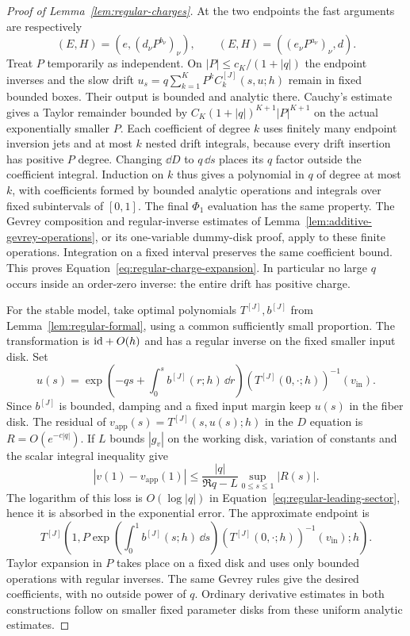 \begin{proof}[Proof of Lemma~\ref{lem:regular-charges}]
At the two endpoints the fast arguments are respectively
\[
 (E,H)=(e,(d_\nu P^{b_\nu})_\nu),\qquad
 (E,H)=((e_\nu P^{a_\nu})_\nu,d).
\]
Treat $P$ temporarily as independent.  On
$|P|\le c_K/(1+|q|)$ the endpoint inverses and the slow drift
$u_s=q\sum_{k=1}^KP^kC_k^{[J]}(s,u;h)$ remain in fixed bounded
boxes.  Their output is bounded and analytic there.  Cauchy's
estimate gives a Taylor remainder bounded by
$C_K(1+|q|)^{K+1}|P|^{K+1}$ on the actual exponentially smaller
$P$.  Each coefficient of degree $k$ uses finitely many endpoint
inversion jets and at most $k$ nested drift integrals, because every
drift insertion has positive $P$ degree.  Changing $\dd D$ to
$q\,\dd s$ places its $q$ factor outside the coefficient integral.
Induction on $k$ thus gives a polynomial in $q$ of degree at most
$k$, with coefficients formed by bounded analytic operations and
integrals over fixed subintervals of $[0,1]$.  The final $\Phi_1$
evaluation has the same property.  The Gevrey composition and
regular-inverse estimates of Lemma~\ref{lem:additive-gevrey-operations},
or its one-variable dummy-disk proof, apply to these finite operations.
Integration on a fixed interval preserves the same coefficient
bound.  This proves Equation~\eqref{eq:regular-charge-expansion}.  In
particular no large $q$ occurs inside an order-zero inverse: the
entire drift has positive charge.

For the stable model, take optimal polynomials $T^{[J]},b^{[J]}$
from Lemma~\ref{lem:regular-formal}, using a common sufficiently
small proportion.  The transformation is $\mathrm{id}+O(h)$ and has a
regular inverse on the fixed smaller input disk.  Set
\[
 u(s)=\exp\left(-qs+\int_0^s b^{[J]}(r;h)\,\dd r\right)
                  (T^{[J]}(0,\cdot;h))^{-1}(v_{\mathrm{in}}).
\]
Since $b^{[J]}$ is bounded, damping and a fixed input margin keep
$u(s)$ in the fiber disk.  The residual of
$v_{\mathrm{app}}(s)=T^{[J]}(s,u(s);h)$ in the $D$ equation is
$R=O(e^{-c|q|})$.  If $L$ bounds $|g_v|$ on the working disk,
variation of constants and the scalar integral inequality give
\[
 |v(1)-v_{\mathrm{app}}(1)|
 \le \frac{|q|}{\Re q-L}\sup_{0\le s\le1}|R(s)|.
\]
The logarithm of this loss is $O(\log|q|)$ in
Equation~\eqref{eq:regular-leading-sector}, hence it is absorbed in the
exponential error.  The approximate endpoint is
\begin{equation}\label{eq:regular-stable-endpoint}
 T^{[J]}\left(1,
 P\exp\left(\int_0^1b^{[J]}(s;h)\,\dd s\right)
       (T^{[J]}(0,\cdot;h))^{-1}(v_{\mathrm{in}});h\right).
\end{equation}
Taylor expansion in $P$ takes place on a fixed disk and uses only
bounded operations with regular inverses.  The same Gevrey rules
give the desired coefficients, with no outside power of $q$.
Ordinary derivative estimates in both constructions follow on
smaller fixed parameter disks from these uniform analytic estimates.
\end{proof}

